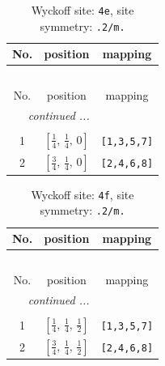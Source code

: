 \documentclass[fleqn,8pt]{jsarticle}
\begin{document}
\begin{longtable}{ccc}
\caption{Wyckoff site: {\tt 4e}, site symmetry: {\tt .2/m.}}
 \\
 \hline \hline
No. & position & mapping \\ \hline \endfirsthead

\multicolumn{2}{l}{\tablename\ \thetable{}} \\
 \hline \hline
No. & position & mapping \\ \hline \endhead

 \hline \hline
\multicolumn{2}{r}{\footnotesize\it continued ...} \\ \endfoot

 \hline \hline
\multicolumn{2}{r}{} \\ \endlastfoot

1 & $\left[ \frac{1}{4},\, \frac{1}{4},\, 0 \right]$ & {\tt [1,3,5,7]} \\ \hline
2 & $\left[ \frac{3}{4},\, \frac{1}{4},\, 0 \right]$ & {\tt [2,4,6,8]} \\
\end{longtable}
\renewcommand{\arraystretch}{1.2}
\begin{longtable}{ccc}
\caption{Wyckoff site: {\tt 4f}, site symmetry: {\tt .2/m.}}
 \\
 \hline \hline
No. & position & mapping \\ \hline \endfirsthead

\multicolumn{2}{l}{\tablename\ \thetable{}} \\
 \hline \hline
No. & position & mapping \\ \hline \endhead

 \hline \hline
\multicolumn{2}{r}{\footnotesize\it continued ...} \\ \endfoot

 \hline \hline
\multicolumn{2}{r}{} \\ \endlastfoot

1 & $\left[ \frac{1}{4},\, \frac{1}{4},\, \frac{1}{2} \right]$ & {\tt [1,3,5,7]} \\ \hline
2 & $\left[ \frac{3}{4},\, \frac{1}{4},\, \frac{1}{2} \right]$ & {\tt [2,4,6,8]} \\
\end{longtable}
\renewcommand{\arraystretch}{1.2}
\end{document}
